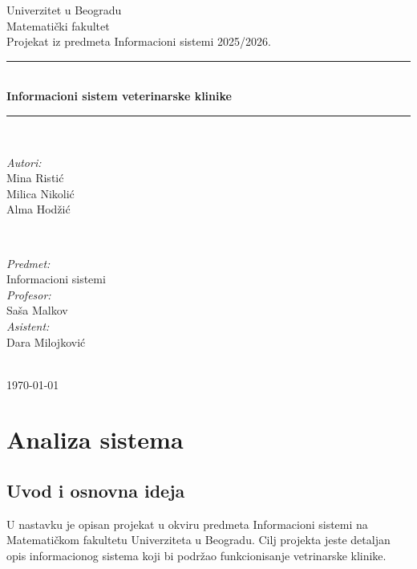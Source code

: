 \documentclass{article}
\begin{document}
\begin{titlepage}
    \centering

    \newcommand{\HRule}{\rule{\linewidth}{0.5mm}}
    \center
    \textup{\Large Univerzitet u Beogradu\\Matematički fakultet}\\[1.5cm]
    \textup{\Large Projekat iz predmeta Informacioni sistemi 2025/2026.}\\[0.4cm]

    \HRule \\[0.4cm]
    { \huge \bfseries Informacioni sistem veterinarske klinike}\\[0.4cm]
    \HRule \\[1.1cm]
    
    \vspace{6 cm}
	
	\begin{minipage}{0.4\textwidth}
		\begin{flushleft} \large
			\emph{Autori:}\\
			Mina Ristić\\
			Milica Nikolić\\
			Alma Hodžić\\		
		\end{flushleft}
	\end{minipage}
	~
	\begin{minipage}{0.5\textwidth}
		\begin{flushright} \large
			\emph{Predmet:}\\ 
			Informacioni sistemi\\
			\emph{Profesor:}\\ 
			Saša Malkov\\
			\emph{Asistent:}\\ 
			Dara Milojković
		\end{flushright}
	\end{minipage}\\[2cm]
	{\large \today}\\[2cm]
\end{titlepage}

\thispagestyle{empty}

\newpage
\renewcommand*\contentsname{Sadržaj:}
\tableofcontents


\newpage
\section{Analiza sistema}

\subsection{Uvod i osnovna ideja}
	U nastavku je opisan projekat u okviru predmeta Informacioni sistemi na Matematičkom fakultetu Univerziteta u Beogradu. Cilj projekta jeste detaljan opis informacionog sistema koji bi podržao funkcionisanje vetrinarske klinike.
\end{document}
